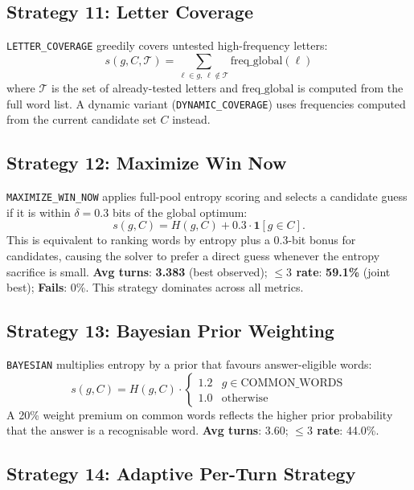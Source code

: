 \documentclass{article}
\begin{document}
\subsection{Strategy 11: Letter Coverage}
\label{sec:strategy11}

\texttt{LETTER\_COVERAGE} greedily covers untested high-frequency letters:
\[
  s(g, C, \mathcal{T}) = \sum_{\ell \in g,\, \ell \notin \mathcal{T}} \text{freq\_global}(\ell)
\]
where $\mathcal{T}$ is the set of already-tested letters and $\text{freq\_global}$
is computed from the full word list. A dynamic variant (\texttt{DYNAMIC\_COVERAGE})
uses frequencies computed from the current candidate set $C$ instead.

\subsection{Strategy 12: Maximize Win Now}
\label{sec:strategy12}

\texttt{MAXIMIZE\_WIN\_NOW} applies full-pool entropy scoring and selects a
candidate guess if it is within $\delta = 0.3$ bits of the global optimum:
\[
  s(g, C) = H(g, C) + 0.3 \cdot \mathbf{1}[g \in C].
\]
This is equivalent to ranking words by entropy plus a 0.3-bit bonus for candidates,
causing the solver to prefer a direct guess whenever the entropy sacrifice is small.
\textbf{Avg turns}: \textbf{3.383} (best observed); \textbf{$\leq 3$ rate}: \textbf{59.1\%}
(joint best); \textbf{Fails}: 0\%. This strategy dominates across all metrics.

\subsection{Strategy 13: Bayesian Prior Weighting}
\label{sec:strategy13}

\texttt{BAYESIAN} multiplies entropy by a prior that favours answer-eligible words:
\[
  s(g, C) = H(g, C) \cdot \begin{cases} 1.2 & g \in \text{COMMON\_WORDS} \\ 1.0 & \text{otherwise} \end{cases}
\]
A 20\% weight premium on common words reflects the higher prior probability that
the answer is a recognisable word. \textbf{Avg turns}: 3.60; \textbf{$\leq 3$ rate}: 44.0\%.

\subsection{Strategy 14: Adaptive Per-Turn Strategy}
\label{sec:strategy14}
\end{document}
